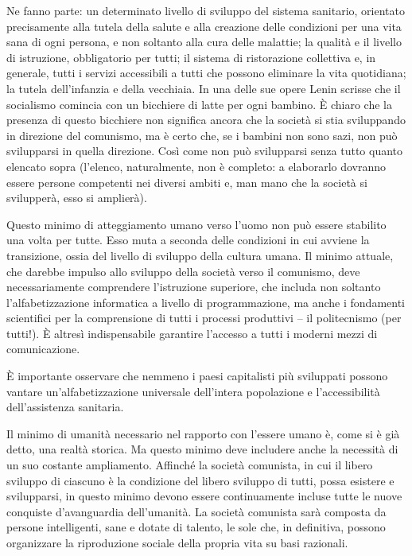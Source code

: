 \documentclass[../main]{subfiles}
\begin{document}
Ne fanno parte: un determinato livello di sviluppo del sistema sanitario, orientato precisamente alla tutela della salute e alla creazione delle condizioni per una vita sana di ogni persona, e non soltanto alla cura delle malattie; la qualità e il livello di istruzione, obbligatorio per tutti; il sistema di ristorazione collettiva e, in generale, tutti i servizi accessibili a tutti che possono eliminare la vita quotidiana; la tutela dell'infanzia e della vecchiaia. In una delle sue opere Lenin scrisse che il socialismo comincia con un bicchiere di latte per ogni bambino. È chiaro che la presenza di questo bicchiere non significa ancora che la società si stia sviluppando in direzione del comunismo, ma è certo che, se i bambini non sono sazi, non può svilupparsi in quella direzione. Così come non può svilupparsi senza tutto quanto elencato sopra (l'elenco, naturalmente, non è completo: a elaborarlo dovranno essere persone competenti nei diversi ambiti e, man mano che la società si svilupperà, esso si amplierà).

Questo minimo di atteggiamento umano verso l'uomo non può essere stabilito una volta per tutte. Esso muta a seconda delle condizioni in cui avviene la transizione, ossia del livello di sviluppo della cultura umana. Il minimo attuale, che darebbe impulso allo sviluppo della società verso il comunismo, deve necessariamente comprendere l'istruzione superiore, che includa non soltanto l'alfabetizzazione informatica a livello di programmazione, ma anche i fondamenti scientifici per la comprensione di tutti i processi produttivi – il politecnismo (per tutti!). È altresì indispensabile garantire l'accesso a tutti i moderni mezzi di comunicazione.

È importante osservare che nemmeno i paesi capitalisti più sviluppati possono vantare un'alfabetizzazione universale dell'intera popolazione e l'accessibilità dell'assistenza sanitaria.

Il minimo di umanità necessario nel rapporto con l'essere umano è, come si è già detto, una realtà storica. Ma questo minimo deve includere anche la necessità di un suo costante ampliamento. Affinché la società comunista, in cui il libero sviluppo di ciascuno è la condizione del libero sviluppo di tutti, possa esistere e svilupparsi, in questo minimo devono essere continuamente incluse tutte le nuove conquiste d'avanguardia dell'umanità. La società comunista sarà composta da persone intelligenti, sane e dotate di talento, le sole che, in definitiva, possono organizzare la riproduzione sociale della propria vita su basi razionali.
\end{document}
